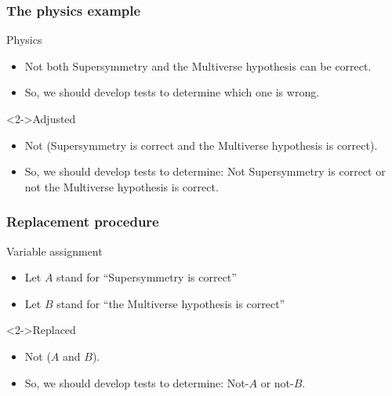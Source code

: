 \documentclass[10pt,letterpaper,xcolor=dvipsnames]{beamer}
\begin{document}
\begin{frame}
  \frametitle{The physics example}
  
  \begin{block}{Physics}
  \begin{itemize}
    \item \alert{Not} \alert{both} Supersymmetry \alert{and} the Multiverse hypothesis can be correct.
    \item So, we should develop tests to determine \alert{which one} is \alert{wrong}.
  \end{itemize}
\end{block}

  \begin{block}<2->{Adjusted}
      \begin{itemize}
    \item \alert{Not} (Supersymmetry is correct \alert{and} the Multiverse hypothesis is correct).
    \item So, we should develop tests to determine: \alert{Not} Supersymmetry is correct \alert{or} \alert{not} the Multiverse hypothesis is correct.
  \end{itemize}
  \end{block}
\end{frame}

\begin{frame}
\frametitle{Replacement procedure}

  \begin{block}{Variable assignment}
    \begin{itemize}
      \item Let $A$ stand for ``Supersymmetry is correct''
      \item Let $B$ stand for ``the Multiverse hypothesis is correct''
    \end{itemize}
  \end{block}
  
  \begin{block}<2->{Replaced}
    \begin{itemize}
    \item Not ($A$ and $B$).
    \item So, we should develop tests to determine: Not-$A$ or not-$B$.
    \end{itemize}
  \end{block}
  
\end{frame}
\end{document}
